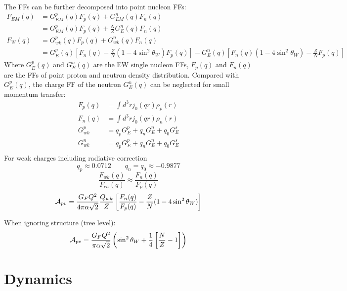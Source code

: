 The FFs can be further decomposed into point nucleon FFs:
\begin{equation*}
    \begin{aligned}
	F_{EM}(q) &= G_{EM}^p(q)F_p(q) + G_{EM}^n(q)F_n(q)  \\
		  &= G_{EM}^p(q)F_p(q) + \frac{N}{Z}G_E^n(q)F_n(q)	\\
	F_{W}(q) &= G_{wk}^p(q)F_p(q) + G_{wk}^n(q)F_n(q)  \\
		  &= G_E^p(q)\left[ F_n(q) - \frac{Z}{N}(1-4\sin^2\theta_W)F_p(q)\right] - G_E^n(q)\left[ F_n(q)(1-4\sin^2\theta_W) - \frac{Z}{N}F_p(q)\right]
    \end{aligned}
\end{equation*}
Where $G_E^p(q)$ and $G_E^n(q)$ are the EW single nucleon FFs, 
$F_p(q)$ and $F_n(q)$ are the FFs of point proton and neutron density distribution. 
Compared with $G_E^p(q)$, the charge FF of the neutron $G_E^n(q)$ can be neglected for small momentum transfer:
\begin{equation*}
    \begin{aligned}
	F_p(q) &= \int d^3r j_0(qr) \rho_p(r)	\\
	F_n(q) &= \int d^3r j_0(qr) \rho_n(r)	\\
	G_{wk}^p &= q_p G_E^p + q_n G_E^n + q_0 G_E^s	\\
	G_{wk}^n &= q_p G_E^p + q_n G_E^n + q_0 G_E^s	\\
    \end{aligned}
\end{equation*}
For weak charges including radiative correction
$$ q_p \approx 0.0712	\qquad q_n = q_0 \approx -0.9877 $$
$$ \frac{F_{wk}(q)}{F_{ch}(q)} \approx \frac{F_n(q)}{F_p(q)}$$
$$ \mathcal{A}_{pv} = \frac{G_FQ^2}{4\pi\alpha\sqrt{2}}\frac{Q_{wk}}{Z}\left[ \frac{F_n(q)}{F_p(q)} - \frac{Z}{N}(1-4\sin^2\theta_W) \right]$$

\bigskip
When ignoring structure (tree level):
\begin{equation*}
    \mathcal{A}_{\text{pv}} = \frac{G_F Q^2}{\pi\alpha\sqrt{2}} \left(\sin^2\theta_W + \frac{1}{4}\left[ \frac{N}{Z} - 1 \right] \right)
\end{equation*}

\section{Dynamics}
\begin{center}
\end{center}

